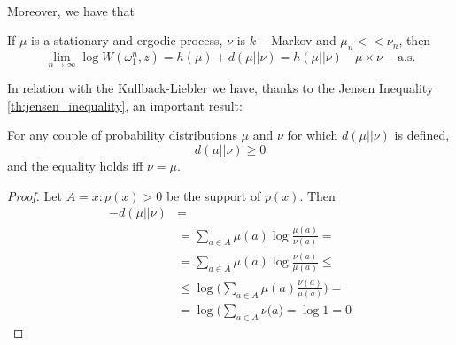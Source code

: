\\Moreover, we have that
\begin{theorem}
If $\mu$ is a stationary and ergodic process, $\nu$ is $k-$Markov and $\mu_n << \nu_n$, then 
\begin{equation}
    \lim_{n \rightarrow \infty}  \log W(\omega_1^n, z) = h(\mu) + d(\mu || \nu) = h(\mu || \nu) \quad \mu \times \nu-\text{a.s.}
\end{equation}
\end{theorem}
In relation with the Kullback-Liebler we have, thanks to the Jensen Inequality \ref{th:jensen_inequality}, an important result:
\begin{theorem}
    For any couple of probability distributions $\mu$ and $\nu$ for which $d(\mu || \nu)$ is defined,
    \begin{equation}
        d(\mu || \nu) \geq 0
    \end{equation}
    and the equality holds iff $\nu = \mu$.
\end{theorem}
\begin{proof}
    Let $A = x : p(x) > 0$ be the support of $p(x)$. Then
    \begin{align*}
        - d (\mu || \nu) & = \\
        & = \sum_{a \in A} \mu(a) \log \frac{\mu(a)}{\nu(a)} = \\ 
        & =  \sum_{a \in A} \mu(a) \log \frac{\nu(a)}{\mu(a)} \leq \\
        & \leq \log \big( \sum_{a \in A} \mu(a) \frac{\nu(a)}{\mu(a)} \big) = \\ 
        & = \log \big( \sum_{a \in A} \nu(a \big) = \log 1 = 0
    \end{align*}
\end{proof}

